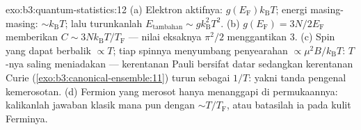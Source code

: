 \begin{solution}{exo:b3:quantum-statistics:12}
(a) Elektron aktifnya: $g(E_{\text{F}})k_{\text{B}}T$; energi
masing-masing: $\sim k_{\text{B}}T$; lalu turunkanlah $E_{\text{tambahan}} \sim
g k_{\text{B}}^2T^2$. (b) $g(E_{\text{F}}) = 3N/2E_{\text{F}}$
memberikan $C \sim 3Nk_{\text{B}}T/T_{\text{F}}$ --- nilai eksaknya
$\pi^2/2$ menggantikan 3. (c) Spin yang dapat berbalik $\propto T$; tiap
spinnya menyumbang penyearahan $\propto \mu^2B/k_{\text{B}}T$: $T$-nya
saling meniadakan --- kerentanan Pauli bersifat datar sedangkan kerentanan
Curie (\cref{exo:b3:canonical-ensemble:11}) turun sebagai $1/T$: yakni
tanda pengenal kemerosotan. (d) Fermion yang merosot hanya menanggapi di
permukaannya: kalikanlah jawaban klasik mana pun dengan $\sim
T/T_{\text{F}}$, atau batasilah ia pada kulit Ferminya.
\end{solution}

